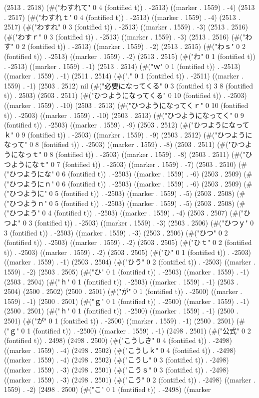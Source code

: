 {(2513 . 2518) (#("わすれて" 0 4 (fontified t)) . -2513) ((marker . 1559) . -4) (2513 . 2517) (#("わすれｔ" 0 4 (fontified t)) . -2513) ((marker . 1559) . -4) (2513 . 2517) (#("わすれ" 0 3 (fontified t)) . -2513) ((marker . 1559) . -3) (2513 . 2516) (#("わすｒ" 0 3 (fontified t)) . -2513) ((marker . 1559) . -3) (2513 . 2516) (#("わす" 0 2 (fontified t)) . -2513) ((marker . 1559) . -2) (2513 . 2515) (#("わｓ" 0 2 (fontified t)) . -2513) ((marker . 1559) . -2) (2513 . 2515) (#("わ" 0 1 (fontified t)) . -2513) ((marker . 1559) . -1) (2513 . 2514) (#("ｗ" 0 1 (fontified t)) . -2513) ((marker . 1559) . -1) (2511 . 2514) (#("." 0 1 (fontified t)) . -2511) ((marker . 1559) . -1) (2503 . 2512) nil (#("必要になってくる" 0 3 (fontified t) 3 8 (fontified t)) . 2503) (2503 . 2511) (#("ひつようになってくる" 0 10 (fontified t)) . -2503) ((marker . 1559) . -10) (2503 . 2513) (#("ひつようになってくｒ" 0 10 (fontified t)) . -2503) ((marker . 1559) . -10) (2503 . 2513) (#("ひつようになってく" 0 9 (fontified t)) . -2503) ((marker . 1559) . -9) (2503 . 2512) (#("ひつようになってｋ" 0 9 (fontified t)) . -2503) ((marker . 1559) . -9) (2503 . 2512) (#("ひつようになって" 0 8 (fontified t)) . -2503) ((marker . 1559) . -8) (2503 . 2511) (#("ひつようになっｔ" 0 8 (fontified t)) . -2503) ((marker . 1559) . -8) (2503 . 2511) (#("ひつようになｔ" 0 7 (fontified t)) . -2503) ((marker . 1559) . -7) (2503 . 2510) (#("ひつようにな" 0 6 (fontified t)) . -2503) ((marker . 1559) . -6) (2503 . 2509) (#("ひつようにｎ" 0 6 (fontified t)) . -2503) ((marker . 1559) . -6) (2503 . 2509) (#("ひつように" 0 5 (fontified t)) . -2503) ((marker . 1559) . -5) (2503 . 2508) (#("ひつようｎ" 0 5 (fontified t)) . -2503) ((marker . 1559) . -5) (2503 . 2508) (#("ひつよう" 0 4 (fontified t)) . -2503) ((marker . 1559) . -4) (2503 . 2507) (#("ひつよ" 0 3 (fontified t)) . -2503) ((marker . 1559) . -3) (2503 . 2506) (#("ひつｙ" 0 3 (fontified t)) . -2503) ((marker . 1559) . -3) (2503 . 2506) (#("ひつ" 0 2 (fontified t)) . -2503) ((marker . 1559) . -2) (2503 . 2505) (#("ひｔ" 0 2 (fontified t)) . -2503) ((marker . 1559) . -2) (2503 . 2505) (#("ひ" 0 1 (fontified t)) . -2503) ((marker . 1559) . -1) (2503 . 2504) (#("ひう" 0 2 (fontified t)) . -2503) ((marker . 1559) . -2) (2503 . 2505) (#("ひ" 0 1 (fontified t)) . -2503) ((marker . 1559) . -1) (2503 . 2504) (#("ｈ" 0 1 (fontified t)) . -2503) ((marker . 1559) . -1) (2503 . 2504) (2500 . 2502) (2500 . 2501) (#("が" 0 1 (fontified t)) . -2500) ((marker . 1559) . -1) (2500 . 2501) (#("ｇ" 0 1 (fontified t)) . -2500) ((marker . 1559) . -1) (2500 . 2501) (#("ｈ" 0 1 (fontified t)) . -2500) ((marker . 1559) . -1) (2500 . 2501) (#("が" 0 1 (fontified t)) . -2500) ((marker . 1559) . -1) (2500 . 2501) (#("ｇ" 0 1 (fontified t)) . -2500) ((marker . 1559) . -1) (2498 . 2501) (#("公式" 0 2 (fontified t)) . 2498) (2498 . 2500) (#("こうしき" 0 4 (fontified t)) . -2498) ((marker . 1559) . -4) (2498 . 2502) (#("こうしｋ" 0 4 (fontified t)) . -2498) ((marker . 1559) . -4) (2498 . 2502) (#("こうし" 0 3 (fontified t)) . -2498) ((marker . 1559) . -3) (2498 . 2501) (#("こうｓ" 0 3 (fontified t)) . -2498) ((marker . 1559) . -3) (2498 . 2501) (#("こう" 0 2 (fontified t)) . -2498) ((marker . 1559) . -2) (2498 . 2500) (#("こ" 0 1 (fontified t)) . -2498) ((marker }
